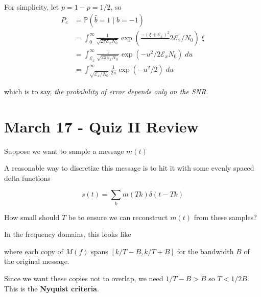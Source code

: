 \documentclass[12pt]{report}
\renewcommand{\hat}[1]{\widehat{#1}}
\renewcommand{\P}{\mathbb{P}}
\newcommand{\Ec}{\mathcal{E}}
\newcommand*{\tbf}[1]{\ifmmode\mathbf{#1}\else\textbf{#1}\fi}
\begin{document}
For simplicity, let $p  = 1 - p = 1/2$, so 
\begin{align*}
    P_e &= \P(\hat b = 1 \; | \; b= -1)\\ 
    &= \int_0^{\infty} \frac{1}{\sqrt{2\pi \Ec_x N_0}} \exp\left(\frac{-(\xi + \Ec_x)^2}{}2\Ec_x/N_0\right) \; \xi \\ 
    &= \int_{\Ec_x}^{\infty} \frac{1}{\sqrt{2\pi \Ec_x N_0}} \exp\left(-u^2 / 2\Ec_x N_0\right)\; du\\ 
    &= \int_{\sqrt{\Ec_x/N_0}}^{\infty} \frac{1}{2\pi} \exp(-u^2/2)\; du 
\end{align*}

which is to say, \emph{the probability of error depends only on the SNR.}

\section{March 17 - Quiz II Review}

Suppose we want to sample a message $m(t)$ 

\begin{center}
\end{center}

A reasonable way to discretize this message is to hit it with some evenly spaced delta functions 

\[s(t) = \sum_k m(Tk) \delta(t - Tk)\]

How small should $T$ be to ensure we can reconstruct $m(t)$ from these samples?

In the frequency domains, this looks like 

\begin{center}
\end{center}
where each copy of $M(f)$ spans $[k/T - B, k/T + B]$ for the bandwidth $B$ of the original message.

Since we want these copies not to overlap, we need $1/T - B > B$ so $T < 1/2B$. This is the \tbf{Nyquist criteria}.
\end{document}
